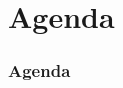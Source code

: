 {
    
  \begin{frame}
    \titlepage
  \end{frame}
}

\section*{Agenda}
\begin{frame}
  \frametitle{Agenda}
  \tableofcontents[hideallsubsections]
\end{frame}
